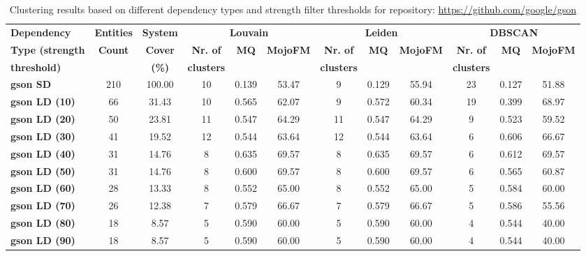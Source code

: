 \documentclass{ieeeaccess}
\begin{document}
\begin{table}[htbp]
\centering
\caption{Clustering results based on different dependency types and strength filter thresholds for repository: \href{https://github.com/google/gson}{https://github.com/google/gson}}
\label{tab:clustering_results_gson}
\setlength{\tabcolsep}{7pt} 
\begin{tabular}{|l|c|c|ccc|ccc|ccc|}
\hline
 \textbf{Dependency} &  \textbf{Entities} & \textbf{System} & \multicolumn{3}{c|}{\textbf{Louvain}} & \multicolumn{3}{c|}{\textbf{Leiden}} & \multicolumn{3}{c|}{\textbf{DBSCAN}} \\
\cline{4-12}
\textbf{Type (strength } &  \textbf{Count} & \textbf{Cover} & \textbf{Nr. of } & \textbf{MQ} & \textbf{MojoFM} & \textbf{Nr. of} & \textbf{MQ} & \textbf{MojoFM} & \textbf{Nr. of} & \textbf{MQ} & \textbf{MojoFM}  \\
\textbf{threshold)} &  & \textbf{(\%)} & \textbf{clusters} & & & \textbf{clusters} & &  & \textbf{clusters} & &\\
\hline
\rowcolor[HTML]{ECECEC} \textbf{gson SD} & 210 & 100.00 & 10 & 0.139 & 53.47 & 9 & 0.129 & 55.94 & 23 & 0.127 & 51.88 \\
\textbf{gson LD (10)} & 66 & 31.43 & 10 & 0.565 & 62.07 & 9 & 0.572 & 60.34 & 19 & 0.399 & 68.97 \\
\textbf{gson LD (20)} & 50 & 23.81 & 11 & 0.547 & 64.29 & 11 & 0.547 & 64.29 & 9 & 0.523 & 59.52 \\
\textbf{gson LD (30)} & 41 & 19.52 & 12 & 0.544 & 63.64 & 12 & 0.544 & 63.64 & 6 & 0.606 & 66.67 \\
\textbf{gson LD (40)} & 31 & 14.76 & 8 & \cellcolor[HTML]{fef9e4}0.635 & \cellcolor[HTML]{fef9e4}69.57 & 8 & \cellcolor[HTML]{fef9e4}0.635 & \cellcolor[HTML]{fef9e4}69.57 & 6 & \cellcolor[HTML]{fef9e4}0.612 & \cellcolor[HTML]{fef9e4}69.57 \\
\textbf{gson LD (50)} & 31 & 14.76 & 8 & 0.600 & 69.57 & 8 & 0.600 & 69.57 & 6 & 0.565 & 60.87 \\
\textbf{gson LD (60)} & 28 & 13.33 & 8 & 0.552 & 65.00 & 8 & 0.552 & 65.00 & 5 & 0.584 & 60.00 \\
\textbf{gson LD (70)} & 26 & 12.38 & 7 & 0.579 & 66.67 & 7 & 0.579 & 66.67 & 5 & 0.586 & 55.56 \\
\textbf{gson LD (80)} & 18 & 8.57 & 5 & 0.590 & 60.00 & 5 & 0.590 & 60.00 & 4 & 0.544 & 40.00 \\
\textbf{gson LD (90)} & 18 & 8.57 & 5 & 0.590 & 60.00 & 5 & 0.590 & 60.00 & 4 & 0.544 & 40.00 \\

\end{tabular}
\end{table}
\end{document}
